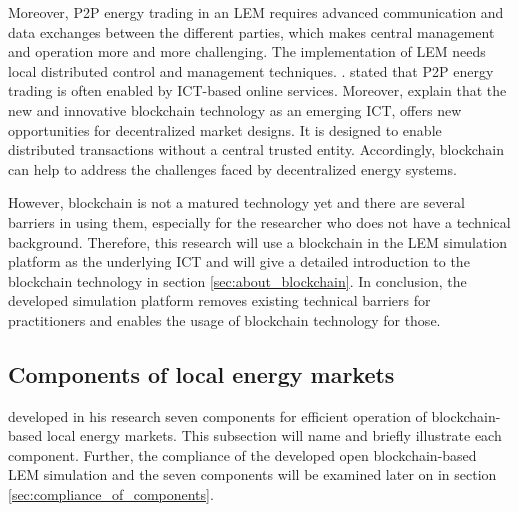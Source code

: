 Moreover, P2P energy trading in an LEM requires advanced communication and data 
exchanges between the different parties, which makes central management and 
operation more and more challenging. The implementation of LEM needs 
local distributed control and management techniques. . 
 stated that P2P energy trading is often
enabled by ICT-based online services. Moreover,  explain that 
the new and innovative blockchain technology as an emerging ICT, 
offers new opportunities for decentralized market designs.
It is designed to enable distributed transactions without 
a central trusted entity.
Accordingly, blockchain can help to address the challenges faced by 
decentralized energy systems. 

However, blockchain is not a matured technology 
yet and there are several barriers in using them, especially 
for the researcher who does not have a technical background. Therefore, this research 
will use a blockchain in the LEM simulation platform as the underlying ICT and will give a
detailed introduction to the blockchain technology in section \ref{sec:about_blockchain}.
In conclusion, the developed simulation platform removes existing technical barriers 
for practitioners and enables the usage of blockchain technology for those.

\subsection{Components of local energy markets}
\label{sec:components_of_local_energy_markets}
 developed in his research seven components for efficient
operation of blockchain-based local energy markets. This subsection will name and briefly 
illustrate each component. Further, the compliance of the developed open blockchain-based
LEM simulation and the seven components will be examined later on in section \ref{sec:compliance_of_components}.

